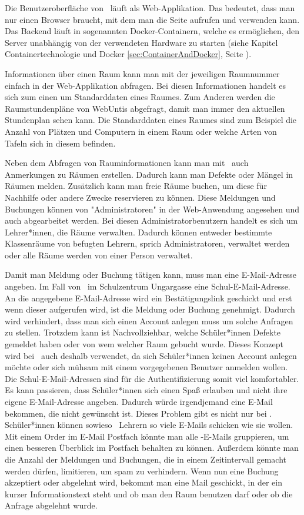 Die Benutzeroberfläche von \ZELIA\ läuft als Web-Applikation. Das bedeutet, dass man nur einen Browser braucht, mit dem man die Seite aufrufen und verwenden kann. Das Backend läuft in sogenannten Docker-Containern, welche es ermöglichen, den Server unabhängig von der verwendeten Hardware zu starten (siehe Kapitel Containertechnologie und Docker \ref{sec:ContainerAndDocker}, Seite \pageref{sec:ContainerAndDocker}).

Informationen über einen Raum kann man mit der jeweiligen Raumnummer einfach in der Web-Applikation abfragen. Bei diesen Informationen handelt es sich zum einen um Standarddaten eines Raumes. Zum Anderen werden die Raumstundenpläne von WebUntis abgefragt, damit man immer den aktuellen Stundenplan sehen kann. Die Standarddaten eines Raumes sind zum Beispiel die Anzahl von Plätzen und Computern in einem Raum oder welche Arten von Tafeln sich in diesem befinden.

Neben dem Abfragen von Rauminformationen kann man mit \ZELIA\ auch Anmerkungen zu Räumen erstellen. Dadurch kann man Defekte oder Mängel in Räumen melden. Zusätzlich kann man freie Räume buchen, um diese für Nachhilfe oder andere Zwecke reservieren zu können. Diese Meldungen und Buchungen können von "Administratoren" in der Web-Anwendung angesehen und auch abgearbeitet werden. Bei diesen Administratorbenutzern handelt es sich um Lehrer*innen, die Räume verwalten. Dadurch können entweder bestimmte Klassenräume von befugten Lehrern, sprich Administratoren, verwaltet werden oder alle Räume werden von einer Person verwaltet.

Damit man Meldung oder Buchung tätigen kann, muss man eine E-Mail-Adresse angeben. Im Fall von \ZELIA\ im Schulzentrum Ungargasse eine Schul-E-Mail-Adresse. An die angegebene E-Mail-Adresse wird ein Bestätigungslink geschickt und erst wenn dieser aufgerufen wird, ist die Meldung oder Buchung genehmigt. Dadurch wird verhindert, dass man sich einen Account anlegen muss um solche Anfragen zu stellen. Trotzdem kann ist Nachvollziehbar, welche Schüler*innen Defekte gemeldet haben oder von wem welcher Raum gebucht wurde. Dieses Konzept wird bei \ZELIA\ auch deshalb verwendet, da sich Schüler*innen keinen Account anlegen möchte oder sich mühsam mit einem vorgegebenen Benutzer anmelden wollen. Die Schul-E-Mail-Adressen sind für die Authentifizierung somit viel komfortabler. Es kann passieren, dass Schüler*innen sich einen Spaß erlauben und nicht ihre eigene E-Mail-Adresse angeben. Dadurch würde irgendjemand eine E-Mail bekommen, die nicht gewünscht ist. Dieses Problem gibt es nicht nur bei \ZELIA. Schüler*innen können sowieso \zb\ Lehrern so viele E-Mails schicken wie sie wollen. Mit einem Order im E-Mail Postfach könnte man alle \ZELIA-E-Mails gruppieren, um einen besseren Überblick im Postfach behalten zu können. Außerdem könnte man die Anzahl der Meldungen und Buchungen, die in einem Zeitintervall gemacht werden dürfen, limitieren, um spam zu verhindern. Wenn nun eine Buchung akzeptiert oder abgelehnt wird, bekommt man eine Mail geschickt, in der ein kurzer Informationstext steht und ob man den Raum benutzen darf oder ob die Anfrage abgelehnt wurde.

